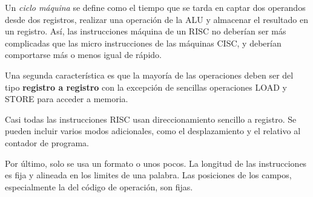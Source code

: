 Un \textit{ciclo máquina} se define como el tiempo que se tarda en captar dos operandos desde dos registros, realizar una operación de la ALU y almacenar el resultado en un registro. Así, las instrucciones máquina de un RISC no deberían ser más complicadas que las micro instrucciones de las máquinas CISC, y deberían comportarse más o menos igual de rápido.

Una segunda característica es que la mayoría de las operaciones deben ser del tipo \textbf{registro a registro} con la excepción de sencillas operaciones LOAD y STORE para acceder a memoria. 

Casi todas las instrucciones RISC usan direccionamiento sencillo a registro. Se pueden incluir varios modos adicionales, como el desplazamiento y el relativo al contador de programa. 

Por último, solo se usa un formato o unos pocos. La longitud de las instrucciones es fija y alineada en los limites de una palabra. Las posiciones de los campos, especialmente la del código de operación, son fijas.